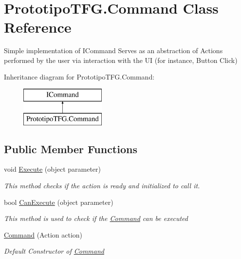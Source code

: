 \hypertarget{class_prototipo_t_f_g_1_1_command}{}\section{Prototipo\+T\+F\+G.\+Command Class Reference}
\label{class_prototipo_t_f_g_1_1_command}


Simple implementation of I\+Command Serves as an abstraction of Actions performed by the user via interaction with the U\+I (for instance, Button Click)  


Inheritance diagram for Prototipo\+T\+F\+G.\+Command\+:\begin{figure}[H]
\begin{center}
\leavevmode
\includegraphics[height=2.000000cm]{class_prototipo_t_f_g_1_1_command}
\end{center}
\end{figure}
\subsection*{Public Member Functions}
\begin{DoxyCompactItemize}
\item 
void \hyperlink{class_prototipo_t_f_g_1_1_command_ac046e06a8fc3180c6c35dc5ae1ba9fe5}{Execute} (object parameter)
\begin{DoxyCompactList}\small\item\em This method checks if the action is ready and initialized to call it. \end{DoxyCompactList}\item 
bool \hyperlink{class_prototipo_t_f_g_1_1_command_a02607d3ca361db266819e3278a537ea3}{Can\+Execute} (object parameter)
\begin{DoxyCompactList}\small\item\em This method is used to check if the \hyperlink{class_prototipo_t_f_g_1_1_command}{Command} can be executed \end{DoxyCompactList}\item 
\hyperlink{class_prototipo_t_f_g_1_1_command_a4749034ee8ae6a635a82163330afd3a4}{Command} (Action action)
\begin{DoxyCompactList}\small\item\em Default Constructor of \hyperlink{class_prototipo_t_f_g_1_1_command}{Command} \end{DoxyCompactList}\end{DoxyCompactItemize}
